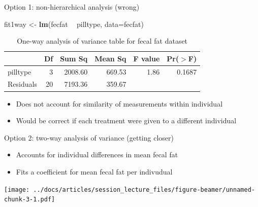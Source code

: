 \documentclass[
  ignorenonframetext,
]{beamer}
\newenvironment{Shaded}{\begin{snugshade}}{\end{snugshade}}
\newcommand{\DataTypeTok}[1]{\textcolor[rgb]{0.13,0.29,0.53}{#1}}
\newcommand{\KeywordTok}[1]{\textcolor[rgb]{0.13,0.29,0.53}{\textbf{#1}}}
\newcommand{\NormalTok}[1]{#1}
\newcommand{\OperatorTok}[1]{\textcolor[rgb]{0.81,0.36,0.00}{\textbf{#1}}}
\newcommand{\StringTok}[1]{\textcolor[rgb]{0.31,0.60,0.02}{#1}}
\providecommand{\tightlist}{%
  \setlength{\itemsep}{0pt}\setlength{\parskip}{0pt}}
\begin{document}
\begin{frame}[fragile]{Option 1: non-hierarchical analysis (wrong)}
\protect\hypertarget{option-1-non-hierarchical-analysis-wrong-1}{}

\footnotesize

\begin{Shaded}
\begin{Highlighting}[]
\NormalTok{fit1way <-}\StringTok{ }\KeywordTok{lm}\NormalTok{(fecfat }\OperatorTok{~}\StringTok{ }\NormalTok{pilltype, }\DataTypeTok{data=}\NormalTok{fecfat)}
\end{Highlighting}
\end{Shaded}

\begin{table}[ht]
\centering
\begin{tabular}{lrrrrr}
  \hline
 & Df & Sum Sq & Mean Sq & F value & Pr($>$F) \\ 
  \hline
pilltype & 3 & 2008.60 & 669.53 & 1.86 & 0.1687 \\ 
  Residuals & 20 & 7193.36 & 359.67 &  &  \\ 
   \hline
\end{tabular}
\caption{One-way analysis of variance table for fecal fat dataset} 
\end{table}

\begin{itemize}
\tightlist
\item
  Does not account for similarity of measurements within individual
\item
  Would be correct if each treatment were given to a different
  individual
\end{itemize}

\end{frame}

\begin{frame}{Option 2: two-way analysis of variance (getting closer)}
\protect\hypertarget{option-2-two-way-analysis-of-variance-getting-closer}{}

\begin{itemize}
\tightlist
\item
  Accounts for individual differences in mean fecal fat
\item
  Fits a coefficient for mean fecal fat per indivudual
\end{itemize}

\texttt{[image: ../docs/articles/session\_lecture\_files/figure-beamer/unnamed-chunk-3-1.pdf]}

\end{frame}
\end{document}
